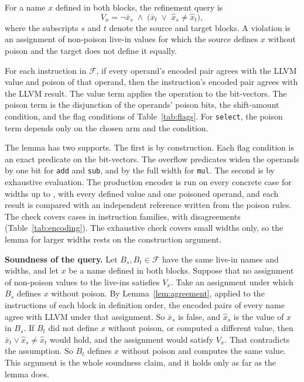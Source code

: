 For a name $x$ defined in both blocks, the refinement query is
\begin{equation}
  V_x=\lnot\bar{x}_s\;\wedge\;\bigl(\bar{x}_t\;\vee\;\hat{x}_s\neq\hat{x}_t\bigr),
\end{equation}
where the subscripts $s$ and $t$ denote the source and target blocks. A violation is an assignment of non-poison live-in
values for which the source defines $x$ without poison and the target does not define it equally.

\begin{lemma}
\label{lem:agreement}
For each instruction in $\mathcal{F}$, if every operand's encoded pair agrees with the LLVM value and poison of that operand,
then the instruction's encoded pair agrees with the LLVM result. The value term applies the operation to the bit-vectors. The
poison term is the disjunction of the operands' poison bits, the shift-amount condition, and the flag conditions of
Table~\ref{tab:flags}. For \texttt{select}, the poison term depends only on the chosen arm and the condition.
\end{lemma}

The lemma has two supports. The first is by construction. Each flag condition is an exact predicate on the bit-vectors.
The overflow predicates widen the operands by one bit for \texttt{add} and \texttt{sub}, and by the full width for
\texttt{mul}. The second is by exhaustive evaluation. The production encoder is run on every concrete case for widths up to
\EncodingMaxWidth{}, with every defined value and one poisoned operand, and each result is compared with an independent
reference written from the poison rules. The check covers \EncodingCases{} cases in \EncodingFamilies{} instruction
families, with \EncodingMismatches{} disagreements (Table~\ref{tab:encoding}). The exhaustive check covers small widths only,
so the lemma for larger widths rests on the construction argument.



\textbf{Soundness of the query.} Let $B_s,B_t\in\mathcal{F}$ have the same live-in names and widths, and let $x$ be a name
defined in both blocks. Suppose that no assignment of non-poison values to the live-ins satisfies $V_x$. Take an assignment
under which $B_s$ defines $x$ without poison. By Lemma~\ref{lem:agreement}, applied to the instructions of each block in
definition order, the encoded pairs of every name agree with LLVM under that assignment. So $\bar{x}_s$ is false, and
$\hat{x}_s$ is the value of $x$ in $B_s$. If $B_t$ did not define $x$ without poison, or computed a different value, then
$\bar{x}_t\vee\hat{x}_s\neq\hat{x}_t$ would hold, and the assignment would satisfy $V_x$. That contradicts the assumption.
So $B_t$ defines $x$ without poison and computes the same value. This argument is the whole soundness claim, and it holds
only as far as the lemma does.

